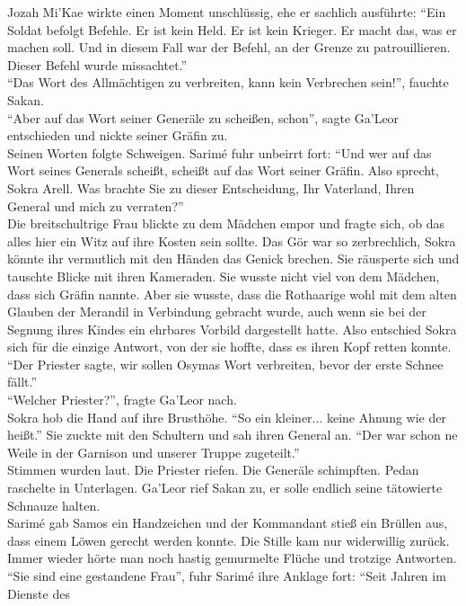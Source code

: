 Jozah Mi'Kae wirkte einen Moment unschlüssig, ehe er sachlich ausführte: ``Ein Soldat befolgt 
Befehle. Er ist kein Held. Er ist kein Krieger. Er macht das, was er machen soll. Und in diesem 
Fall war der Befehl, an der Grenze zu patrouillieren. Dieser Befehl wurde missachtet.''\\
``Das Wort des Allmächtigen zu verbreiten, kann kein Verbrechen sein!'', fauchte Sakan.\\
``Aber auf das Wort seiner Generäle zu scheißen, schon'', sagte Ga'Leor entschieden und nickte 
seiner Gräfin zu.\\
Seinen Worten folgte Schweigen. Sarimé fuhr unbeirrt fort: ``Und wer auf das Wort seines Generals 
scheißt, scheißt auf das Wort seiner Gräfin. Also sprecht, Sokra Arell. Was brachte Sie zu dieser 
Entscheidung, Ihr Vaterland, Ihren General und mich zu verraten?''\\
Die breitschultrige Frau blickte zu dem Mädchen empor und fragte sich, ob das alles hier ein Witz 
auf ihre Kosten sein sollte. Das Gör war so zerbrechlich, Sokra könnte ihr vermutlich mit den 
Händen das Genick brechen. Sie räusperte sich und tauschte Blicke mit ihren Kameraden. Sie wusste 
nicht viel von dem Mädchen, dass sich Gräfin nannte. Aber sie wusste, dass die Rothaarige wohl 
mit dem alten Glauben der Merandil in Verbindung gebracht wurde, auch wenn sie bei der Segnung 
ihres Kindes ein ehrbares Vorbild dargestellt hatte. Also entschied Sokra sich für die einzige 
Antwort, von der sie hoffte, dass es ihren Kopf retten konnte. ``Der Priester sagte, wir sollen 
Osymas Wort verbreiten, bevor der erste Schnee fällt.''\\
``Welcher Priester?'', fragte Ga'Leor nach.\\
Sokra hob die Hand auf ihre Brusthöhe. ``So ein kleiner... keine Ahnung wie der heißt.'' Sie zuckte 
mit den Schultern und sah ihren General an. ``Der war schon ne Weile in der Garnison und 
unserer Truppe zugeteilt.''\\
Stimmen wurden laut. Die Priester riefen. Die Generäle schimpften. Pedan raschelte in Unterlagen. 
Ga'Leor rief Sakan zu, er solle endlich seine tätowierte Schnauze halten.\\
Sarimé gab Samos ein Handzeichen und der Kommandant stieß ein Brüllen aus, dass einem Löwen gerecht 
werden konnte. Die Stille kam nur widerwillig zurück. Immer wieder hörte man noch hastig gemurmelte 
Flüche und trotzige Antworten.\\
``Sie sind eine gestandene Frau'', fuhr Sarimé ihre Anklage fort: ``Seit Jahren im Dienste des 
